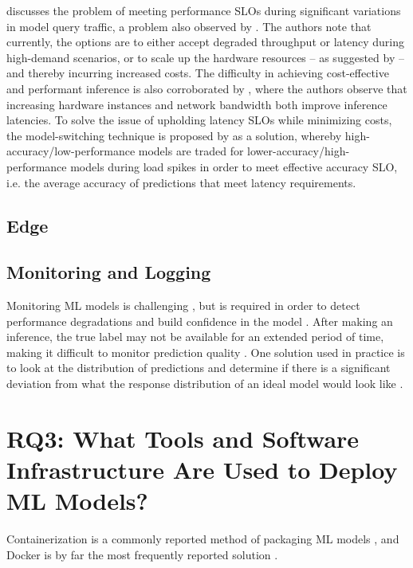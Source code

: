 \cite{Zhang2020} discusses the problem of meeting performance SLOs during significant variations in model query traffic, a problem also observed by \cite{Yadwadkar2019}.
The authors note that currently, the options are to either accept degraded throughput or latency during high-demand scenarios, or to scale up the hardware resources -- as suggested by \cite{Bernardi2019} -- and thereby incurring increased costs.
The difficulty in achieving cost-effective and performant inference is also corroborated by \cite{Chahal2020}, where the authors observe that increasing hardware instances and network bandwidth both improve inference latencies.
To solve the issue of upholding latency SLOs while minimizing costs, the model-switching technique is proposed by \cite{Zhang2020} as a solution, whereby high-accuracy/low-performance models are traded for lower-accuracy/high-performance models during load spikes in order to meet effective accuracy SLO, i.e. the average accuracy of predictions that meet latency requirements.



\subsection{Edge}
\label{ch:results:rq2:edge}

\subsection{Monitoring and Logging}
Monitoring ML models is challenging \cite{Li2017, Bernardi2019}, but is required in order to detect performance degradations and build confidence in the model \cite{Bosch2021}.
After making an inference, the true label may not be available for an extended period of time, making it difficult to monitor prediction quality \cite{Bernardi2019}.
One solution used in practice is to look at the distribution of predictions and determine if there is a significant deviation from what the response distribution of an ideal model would look like \cite{Bernardi2019}.

\section{RQ3: What Tools and Software Infrastructure Are Used to Deploy ML Models?}
Containerization is a commonly reported method of packaging ML models \cite{Ruf2021, Peticolas2019, Rausch2019}, and Docker is by far the most frequently reported solution \cite{Krishnamurthi2019, Richins2020, Li2017,Garcia2020,Crankshaw2017, Paeaekkoenen2020,Gupta2020}.

